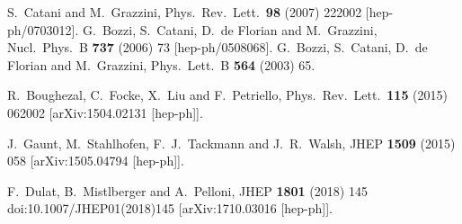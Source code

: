 \documentclass[12pt]{article}
\begin{document}
\begin{thebibliography}{99}
  S.~Catani and M.~Grazzini,
  Phys.\ Rev.\ Lett.\  {\bf 98} (2007) 222002
  [hep-ph/0703012].
%
  G.~Bozzi, S.~Catani, D.~de Florian and M.~Grazzini,
  Nucl.\ Phys.\ B {\bf 737} (2006) 73
  [hep-ph/0508068].
%
G.~Bozzi, S.~Catani, D.~de Florian and M.~Grazzini,
Phys.\ Lett.\ B {\bf 564} (2003) 65.



  R.~Boughezal, C.~Focke, X.~Liu and F.~Petriello,
  Phys.\ Rev.\ Lett.\  {\bf 115} (2015) 062002
  [arXiv:1504.02131 [hep-ph]].

  J.~Gaunt, M.~Stahlhofen, F.~J.~Tackmann and J.~R.~Walsh,
  JHEP {\bf 1509} (2015) 058
  [arXiv:1505.04794 [hep-ph]].

  F.~Dulat, B.~Mistlberger and A.~Pelloni,
  JHEP {\bf 1801} (2018) 145
  doi:10.1007/JHEP01(2018)145
  [arXiv:1710.03016 [hep-ph]].
  

\end{thebibliography}
\end{document}
